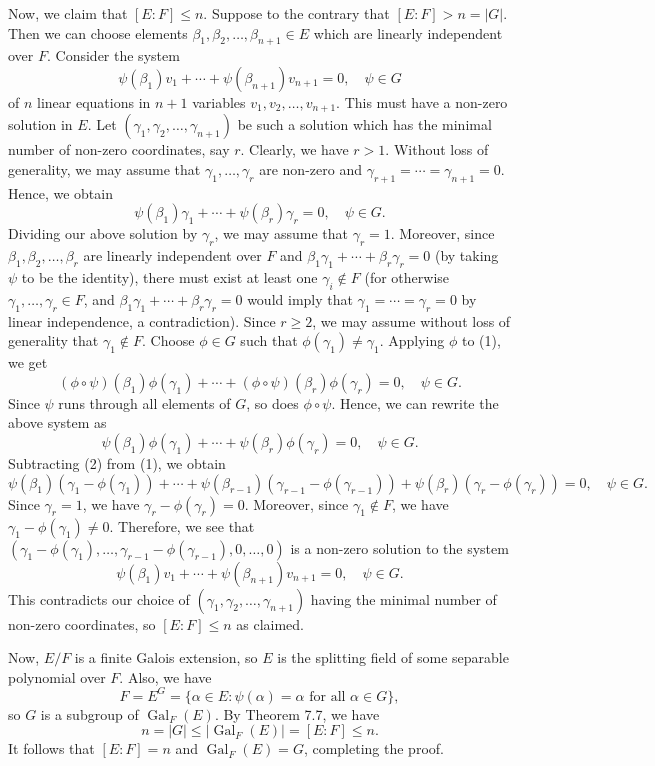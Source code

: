 \documentclass[10pt]{article}
\makeatletter
\DeclareMathOperator{\Gal}{Gal}
\theoremstyle{newstyle}
\newenvironment{pf}[1][\proofname]{\par
  \pushQED{\qed}%
  \normalfont \topsep0\p@\relax
  \trivlist
  \item[\hskip\labelsep\scshape
  #1\@addpunct{.}]\ignorespaces
}{%
  \popQED\endtrivlist\@endpefalse
}
\makeatother
\begin{document}
\begin{pf}
Now, we claim that $[E : F] \leq n$. Suppose to the contrary that $[E : F] > n = |G|$. 
Then we can choose elements $\beta_1, \beta_2, \dots, \beta_{n+1} \in E$ which are linearly 
independent over $F$. Consider the system 
\[ \psi(\beta_1)v_1 + \cdots + \psi(\beta_{n+1})v_{n+1} = 0, \quad \psi \in G \]
of $n$ linear equations in $n+1$ variables $v_1, v_2, \dots, v_{n+1}$. This must have a 
non-zero solution in $E$. Let $(\gamma_1, \gamma_2, \dots, \gamma_{n+1})$ be such a solution 
which has the minimal number of non-zero coordinates, say $r$. Clearly, we have $r > 1$. 
Without loss of generality, we may assume that $\gamma_1, \dots, \gamma_r$ are non-zero and 
$\gamma_{r+1} = \cdots = \gamma_{n+1} = 0$. Hence, we obtain 
\[ \psi(\beta_1)\gamma_1 + \cdots + \psi(\beta_r)\gamma_r = 0, \quad \psi \in G. \tag{$1$} \]
Dividing our above solution by $\gamma_r$, we may assume that $\gamma_r = 1$. 
Moreover, since $\beta_1, \beta_2, \dots, \beta_r$ are linearly independent over $F$ 
and $\beta_1\gamma_1 + \cdots + \beta_r\gamma_r = 0$ (by taking $\psi$ to be the identity), 
there must exist at least one $\gamma_i \notin F$ (for otherwise $\gamma_1, \dots, \gamma_r \in F$, 
and $\beta_1\gamma_1 + \cdots + \beta_r\gamma_r = 0$ would imply that
$\gamma_1 = \cdots = \gamma_r = 0$ by linear independence, a contradiction). 
Since $r \geq 2$, we may assume without loss of generality that $\gamma_1 \notin F$. 
Choose $\phi \in G$ such that $\phi(\gamma_1) \neq \gamma_1$. Applying $\phi$ to (1), we get 
\[ (\phi \circ \psi)(\beta_1) \phi(\gamma_1) + \cdots + (\phi \circ \psi)(\beta_r) \phi(\gamma_r)
= 0, \quad \psi \in G. \]
Since $\psi$ runs through all elements of $G$, so does $\phi \circ \psi$. Hence, we can rewrite the 
above system as 
\[ \psi(\beta_1) \phi(\gamma_1) + \cdots + \psi(\beta_r) \phi(\gamma_r) = 0, \quad \psi \in G. 
\tag{$2$} \]
Subtracting (2) from (1), we obtain 
\[ \psi(\beta_1)(\gamma_1 - \phi(\gamma_1)) + \cdots + 
\psi(\beta_{r-1})(\gamma_{r-1} - \phi(\gamma_{r-1})) 
+ \psi(\beta_r)(\gamma_r - \phi(\gamma_r)) = 0, \quad \psi \in G. \]
Since $\gamma_r = 1$, we have $\gamma_r - \phi(\gamma_r) = 0$. Moreover, since $\gamma_1 \notin F$, 
we have $\gamma_1 - \phi(\gamma_1) \neq 0$. Therefore, we see that 
$(\gamma_1 - \phi(\gamma_1), \dots, \gamma_{r-1} - \phi(\gamma_{r-1}), 0, \dots, 0)$ is a 
non-zero solution to the system 
\[ \psi(\beta_1) v_1 + \cdots + \psi(\beta_{n+1})v_{n+1} = 0, \quad \psi \in G. \]
This contradicts our choice of $(\gamma_1, \gamma_2, \dots, \gamma_{n+1})$ having the 
minimal number of non-zero coordinates, so $[E : F] \leq n$ as claimed. 

Now, $E/F$ is a finite Galois extension, so $E$ is the splitting field of some separable polynomial 
over $F$. Also, we have 
\[ F = E^G = \{\alpha \in E : \psi(\alpha) = \alpha \text{ for all } \alpha \in G\}, \]
so $G$ is a subgroup of $\Gal_F(E)$. By Theorem 7.7, we have 
\[ n = |G| \leq \lvert\Gal_F(E)\rvert = [E : F] \leq n. \]
It follows that $[E : F] = n$ and $\Gal_F(E) = G$, completing the proof. 
\end{pf}
\end{document}

